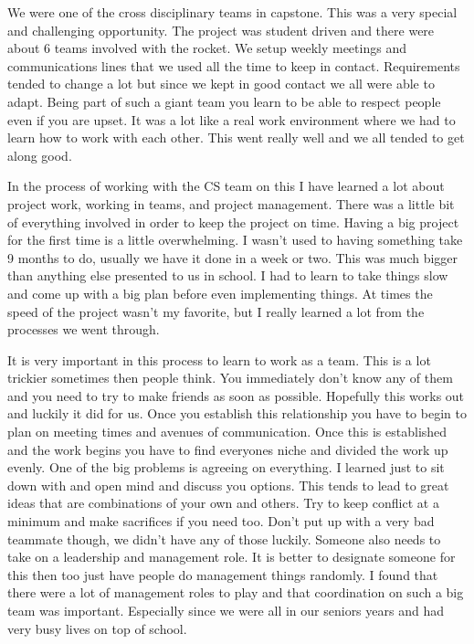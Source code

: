 \documentclass[10pt,draftclsnofoot,onecolumn,retainorgcmds]{IEEEtran}
\begin{document}
We were one of the cross disciplinary teams in capstone. This was a very special and challenging opportunity. The project was student driven and there were about 6 teams involved with the rocket. We setup weekly meetings and communications lines that we used all the time to keep in contact. Requirements tended to change a lot but since we kept in good contact we all were able to adapt. Being part of such a giant team you learn to be able to respect people even if you are upset. It was a lot like a real work environment where we had to learn how to work with each other. This went really well and we all tended to get along good. \par
In the process of working with the CS team on this I have learned a lot about project work, working in teams, and project management. There was a little bit of everything involved in order to keep the project on time. Having a big project for the first time is a little overwhelming. I wasn't used to having something take 9 months to do, usually we have it done in a week or two. This was much bigger than anything else presented to us in school. I had to learn to take things slow and come up with a big plan before even implementing things. At times the speed of the project wasn't my favorite, but I really learned a lot from the processes we went through. \par
It is very important in this process to learn to work as a team. This is a lot trickier sometimes then people think. You immediately don't know any of them and you need to try to make friends as soon as possible. Hopefully this works out and luckily it did for us. Once you establish this relationship you have to begin to plan on meeting times and avenues of communication. Once this is established and the work begins you have to find everyones niche and divided the work up evenly. One of the big problems is agreeing on everything. I learned just to sit down with and open mind and discuss you options. This tends to lead to great ideas that are combinations of your own and others. Try to keep conflict at a minimum and make sacrifices if you need too. Don't put up with a very bad teammate though, we didn't have any of those luckily. Someone also needs to take on a leadership and management role. It is better to designate someone for this then too just have people do management things randomly. I found that there were a lot of management roles to play and that coordination on such a big team was important. Especially since we were all in our seniors years and had very busy lives on top of school.\par
\end{document}
